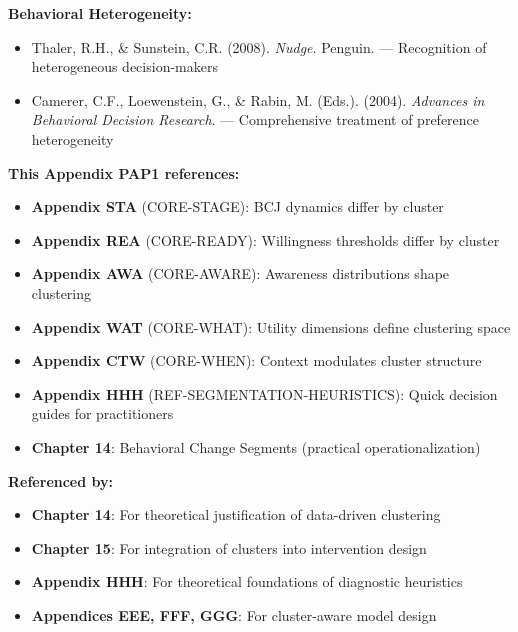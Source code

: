 \textbf{Behavioral Heterogeneity:}
\begin{itemize}
\item Thaler, R.H., \& Sunstein, C.R. (2008). \textit{Nudge}. Penguin.
  --- Recognition of heterogeneous decision-makers
\item Camerer, C.F., Loewenstein, G., \& Rabin, M. (Eds.). (2004).
  \textit{Advances in Behavioral Decision Research}. --- Comprehensive treatment
  of preference heterogeneity
\end{itemize}


\begin{tcolorbox}[colback=purple!5!white, colframe=purple!75!black,
    title=Cross-References]

\textbf{This Appendix PAP1 references:}
\begin{itemize}[nosep]
\item \textbf{Appendix STA} (CORE-STAGE): BCJ dynamics differ by cluster
\item \textbf{Appendix REA} (CORE-READY): Willingness thresholds differ by cluster
\item \textbf{Appendix AWA} (CORE-AWARE): Awareness distributions shape clustering
\item \textbf{Appendix WAT} (CORE-WHAT): Utility dimensions define clustering space
\item \textbf{Appendix CTW} (CORE-WHEN): Context modulates cluster structure
\item \textbf{Appendix HHH} (REF-SEGMENTATION-HEURISTICS): Quick decision guides for practitioners
\item \textbf{Chapter 14}: Behavioral Change Segments (practical operationalization)
\end{itemize}

\textbf{Referenced by:}
\begin{itemize}[nosep]
\item \textbf{Chapter 14}: For theoretical justification of data-driven clustering
\item \textbf{Chapter 15}: For integration of clusters into intervention design
\item \textbf{Appendix HHH}: For theoretical foundations of diagnostic heuristics
\item \textbf{Appendices EEE, FFF, GGG}: For cluster-aware model design
\end{itemize}

\end{tcolorbox}


